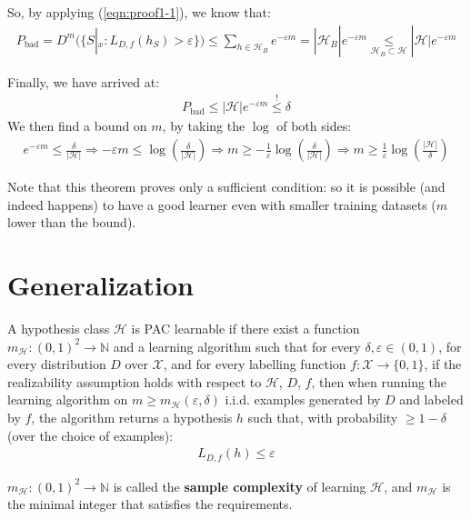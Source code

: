 \documentclass[../template.tex]{subfiles}
\begin{document}
So, by applying (\ref{eqn:proof1-1}), we know that:
\begin{align*}
    P_{\mathrm{bad} } = D^m ( \{S|_x \colon L_{D,f} (h_S) > \varepsilon\}) \leq \sum_{h \in \mathcal{H}_B} e^{-\varepsilon m } = |\mathcal{H}_B| e^{-\varepsilon m} \underset{\mathcal{H}_B \subset \mathcal{H}}{\leq}  |\mathcal{H}| e^{-\varepsilon m}
\end{align*}

Finally, we have arrived at:
\begin{align*}
    P_{\mathrm{bad} } \leq |\mathcal{H}| e^{-\varepsilon m} \overset{!}{\leq}  \delta
\end{align*}
We then find a bound on $m$, by taking the $\log$  of both sides:
\begin{align*}
    e^{-\varepsilon m} \leq \frac{\delta}{|\mathcal{H}|} \Rightarrow - \varepsilon m \leq \log \left(\frac{\delta}{|\mathcal{H}|} \right) \Rightarrow m \geq -\frac{1}{\varepsilon} \log \left(\frac{\delta}{|\mathcal{H}|} \right) \Rightarrow m\geq \frac{1}{\varepsilon} \log \left(\frac{|\mathcal{H}|}{\delta} \right) 
\end{align*} 

Note that this theorem proves only a sufficient condition: so it is possible (and indeed happens) to have a good learner even with smaller training datasets ($m$ lower than the bound).

\section{Generalization}
\begin{dfn}
    A hypothesis class $\mathcal{H}$ is PAC learnable if there exist a function $m_{\mathcal{H}}\colon (0,1)^2 \to \mathbb{N}$ and a learning algorithm such that for every $\delta, \varepsilon \in (0,1)$, for every distribution $D$ over $\mathcal{X}$, and for every labelling function $f\colon \mathcal{X}\to \{0,1\} $, if the realizability assumption holds with respect to $\mathcal{H}$, $D$, $f$, then when running the learning algorithm on $m \geq m_{\mathcal{H}}(\varepsilon, \delta)$ i.i.d. examples generated by $D$ and labeled by $f$, the algorithm returns a hypothesis $h$ such that, with probability $\geq 1- \delta $ (over the choice of examples): 
    \begin{align*}
        L_{D,f}(h) \leq \varepsilon 
    \end{align*}     
\end{dfn}
$m_{\mathcal{H}} \colon (0,1)^2 \to \mathbb{N}$ is called the \textbf{sample complexity} of learning $\mathcal{H}$, and $m_{\mathcal{H}}$ is the minimal integer that satisfies the requirements.\\
\end{document}
